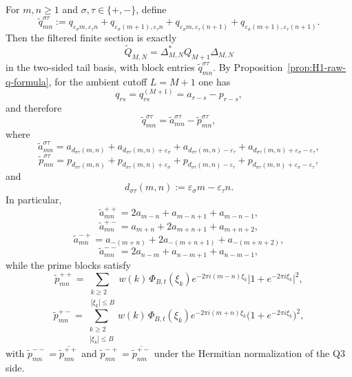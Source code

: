 \begin{proposition}\label{prop:H1-filtered-q-blocks}
For $m,n\ge 1$ and $\sigma,\tau\in\{+,-\}$, define
\[
  \widetilde q_{mn}^{\sigma\tau}
  :=
  q_{\varepsilon_\sigma m,\varepsilon_\tau n}
  +
  q_{\varepsilon_\sigma(m+1),\varepsilon_\tau n}
  +
  q_{\varepsilon_\sigma m,\varepsilon_\tau(n+1)}
  +
  q_{\varepsilon_\sigma(m+1),\varepsilon_\tau(n+1)}.
\]
Then the filtered finite section is exactly
\[
  \widetilde Q_{M,N}=\Delta_{M,N}^*Q_{M+1}\Delta_{M,N}
\]
in the two-sided tail basis, with block entries
$\widetilde q_{mn}^{\sigma\tau}$.
By Proposition~\ref{prop:H1-raw-q-formula}, for the ambient cutoff $L=M+1$ one has
\[
  q_{rs}=q_{rs}^{(M+1)}=a_{r-s}-p_{r-s},
\]
and therefore
\[
  \widetilde q_{mn}^{\sigma\tau}
  =
  \widetilde a_{mn}^{\sigma\tau}
  -
  \widetilde p_{mn}^{\sigma\tau},
\]
where
\[
  \widetilde a_{mn}^{\sigma\tau}
  =
  a_{d_{\sigma\tau}(m,n)}
  +
  a_{d_{\sigma\tau}(m,n)+\varepsilon_\sigma}
  +
  a_{d_{\sigma\tau}(m,n)-\varepsilon_\tau}
  +
  a_{d_{\sigma\tau}(m,n)+\varepsilon_\sigma-\varepsilon_\tau},
\]
\[
  \widetilde p_{mn}^{\sigma\tau}
  =
  p_{d_{\sigma\tau}(m,n)}
  +
  p_{d_{\sigma\tau}(m,n)+\varepsilon_\sigma}
  +
  p_{d_{\sigma\tau}(m,n)-\varepsilon_\tau}
  +
  p_{d_{\sigma\tau}(m,n)+\varepsilon_\sigma-\varepsilon_\tau},
\]
and
\[
  d_{\sigma\tau}(m,n):=\varepsilon_\sigma m-\varepsilon_\tau n.
\]
In particular,
\[
  \widetilde a_{mn}^{++}
  =
  2a_{m-n}+a_{m-n+1}+a_{m-n-1},
\]
\[
  \widetilde a_{mn}^{+-}
  =
  a_{m+n}+2a_{m+n+1}+a_{m+n+2},
\]
\[
  \widetilde a_{mn}^{-+}
  =
  a_{-(m+n)}+2a_{-(m+n+1)}+a_{-(m+n+2)},
\]
\[
  \widetilde a_{mn}^{--}
  =
  2a_{n-m}+a_{n-m+1}+a_{n-m-1},
\]
while the prime blocks satisfy
\[
  \widetilde p_{mn}^{++}
  =
  \sum_{\substack{k\ge2\\ |\xi_k|\le B}}
  w(k)\,\Phi_{B,t}(\xi_k)
  e^{-2\pi i(m-n)\xi_k}
  \bigl|1+e^{-2\pi i\xi_k}\bigr|^2,
\]
\[
  \widetilde p_{mn}^{+-}
  =
  \sum_{\substack{k\ge2\\ |\xi_k|\le B}}
  w(k)\,\Phi_{B,t}(\xi_k)
  e^{-2\pi i(m+n)\xi_k}
  \bigl(1+e^{-2\pi i\xi_k}\bigr)^2,
\]
with $\widetilde p_{mn}^{--}=\overline{\widetilde p_{nm}^{++}}$ and
$\widetilde p_{mn}^{-+}=\overline{\widetilde p_{nm}^{+-}}$ under the Hermitian
normalization of the Q3 side.
\end{proposition}

